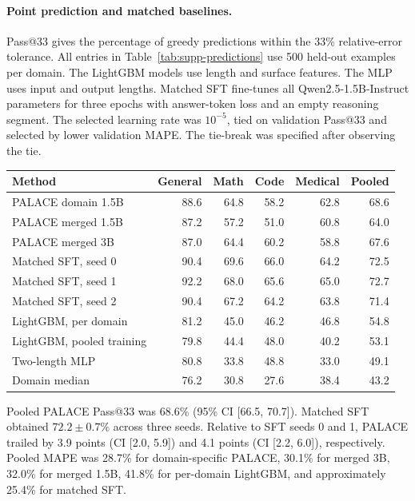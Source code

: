 \documentclass[11pt]{article}
\begin{document}
\paragraph{Point prediction and matched baselines.}
Pass@33 gives the percentage of greedy predictions within the 33\% relative-error tolerance. All entries in Table~\ref{tab:supp-predictions} use 500 held-out examples per domain. The LightGBM models use length and surface features. The MLP uses input and output lengths. Matched SFT fine-tunes all Qwen2.5-1.5B-Instruct parameters for three epochs with answer-token loss and an empty reasoning segment. The selected learning rate was \(10^{-5}\), tied on validation Pass@33 and selected by lower validation MAPE. The tie-break was specified after observing the tie.

\begin{center}
\begin{minipage}{\linewidth}
\centering
{}\label{tab:supp-predictions}
\small
\begin{tabular}{lrrrrr}
\toprule
Method & General & Math & Code & Medical & Pooled\\
\midrule
PALACE domain 1.5B &88.6&64.8&58.2&62.8&68.6\\
PALACE merged 1.5B &87.2&57.2&51.0&60.8&64.0\\
PALACE merged 3B &87.0&64.4&60.2&58.8&67.6\\
Matched SFT, seed 0 &90.4&69.6&66.0&64.2&72.5\\
Matched SFT, seed 1 &92.2&68.0&65.6&65.0&72.7\\
Matched SFT, seed 2 &90.4&67.2&64.2&63.8&71.4\\
LightGBM, per domain &81.2&45.0&46.2&46.8&54.8\\
LightGBM, pooled training &79.8&44.4&48.0&40.2&53.1\\
Two-length MLP &80.8&33.8&48.8&33.0&49.1\\
Domain median &76.2&30.8&27.6&38.4&43.2\\
\bottomrule
\end{tabular}
\end{minipage}
\end{center}
Pooled PALACE Pass@33 was 68.6\% (95\% CI [66.5, 70.7]). Matched SFT obtained \(72.2\pm0.7\%\) across three seeds. Relative to SFT seeds 0 and 1, PALACE trailed by 3.9 points (CI [2.0, 5.9]) and 4.1 points (CI [2.2, 6.0]), respectively. Pooled MAPE was 28.7\% for domain-specific PALACE, 30.1\% for merged 3B, 32.0\% for merged 1.5B, 41.8\% for per-domain LightGBM, and approximately 25.4\% for matched SFT.
\end{document}
